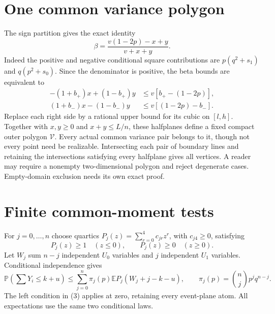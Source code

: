 \documentclass[11pt,a4paper]{article}
\newcommand{\E}{\mathbb E}
\newcommand{\Pp}{\mathbb P}
\begin{document}
\section{One common variance polygon}
The sign partition gives the exact identity
\[
 \beta=\frac{v(1-2p)-x+y}{v+x+y}.
 \tag{2}
\]
Indeed the positive and negative conditional square contributions are
$p(q^2+s_1)$ and $q(p^2+s_0)$. Since the denominator is positive,
the beta bounds are equivalent to
\begin{align*}
 -(1+b_+)x+(1-b_+)y&\le v[b_+-(1-2p)],\\
 (1+b_-)x-(1-b_-)y&\le v[(1-2p)-b_-].
\end{align*}
Replace each right side by a rational upper bound for its cubic on
$[l,h]$. Together with $x,y\ge0$ and $x+y\le L/n$, these halfplanes
define a fixed compact outer polygon $\mathcal V$. Every actual
common variance pair belongs to it, though not every point need be
realizable. Intersecting each pair of boundary lines and retaining
the intersections satisfying every halfplane gives all vertices.
A reader may require a nonempty two-dimensional polygon and reject
degenerate cases. Empty-domain exclusion needs its own exact proof.

\section{Finite common-moment tests}
For $j=0,\ldots,n$ choose quartics
$P_j(z)=\sum_{r=0}^4c_{jr}z^r$, with $c_{j4}\ge0$, satisfying
\[
 P_j(z)\ge1\quad(z\le0),\qquad P_j(z)\ge0\quad(z\ge0).
 \tag{3}
\]
Let $W_j$ sum $n-j$ independent $U_0$ variables and $j$ independent
$U_1$ variables. Conditional independence gives
\[
 \Pp\left(\sum Y_i\le k+u\right)
 \le\sum_{j=0}^n\pi_j(p)\E P_j(W_j+j-k-u),\qquad
 \pi_j(p)=\binom njp^jq^{n-j}.
 \tag{4}
\]
The left condition in (3) applies at zero, retaining every event-plane
atom. All expectations use the same two conditional laws.
\end{document}
